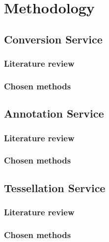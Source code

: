 \chapter{Methodology}
\section{Conversion Service}
\subsection{Literature review}
\subsection{Chosen methods}
\section{Annotation Service}
\subsection{Literature review}
\subsection{Chosen methods}
\section{Tessellation Service}
\subsection{Literature review}
\subsection{Chosen methods}
